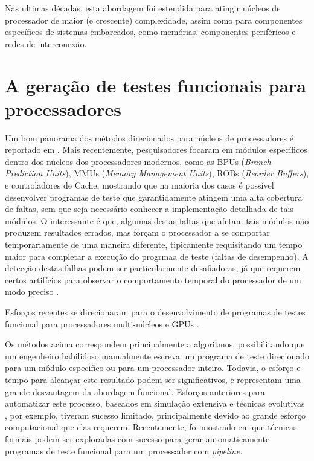 			Nas ultimas décadas, esta abordagem foi estendida para atingir núcleos de processador de maior (e crescente) complexidade, assim como para componentes específicos de sistemas embarcados, como memórias, componentes periféricos e redes de interconexão.
		\section{A geração de testes funcionais para processadores}
			Um bom panorama dos métodos direcionados para núcleos de processadores é reportado em \citet{psarakis2010microprocessor}. Mais recentemente, pesquisadores focaram em módulos específicos dentro dos núcleos dos processadores modernos, como as BPUs (\textit{Branch Prediction Units}), MMUs (\textit{Memory Management Units}), ROBs (\textit{Reorder Buffers}), e controladores de Cache, mostrando que na maioria dos casos é possível desenvolver programas de teste que garantidamente atingem uma alta cobertura de faltas, sem que seja necessário conhecer a implementação detalhada de tais módulos. O interessante é que, algumas destas faltas que afetam tais módulos não produzem resultados errados, mas forçam o processador a se comportar temporariamente de uma maneira diferente, tipicamente requisitando um tempo maior para completar a execução do progrmaa de teste (faltas de desempenho). A detecção destas falhas podem ser particularmente desafiadoras, já que requerem certos artifícios para observar o comportamento temporal do processador de um modo preciso \citep{hatzimihail2007methodology}.
			
			Esforços recentes se direcionaram para o desenvolvimento de programas de testes funcional para processadores multi-núcleos \citep{kaliorakis2014accelerated} e GPUs \citep{di2013software}.
			
			Os métodos acima correspondem principalmente a algoritmos, possibilitando que um engenheiro habilidoso manualmente escreva um programa de teste direcionado para um módulo especifico ou para um processador inteiro. Todavia, o esforço e tempo para alcançar este resultado podem ser significativos, e representam uma grande desvantagem da abordagem funcional. Esforços anteriores para automatizar este processo, baseados em simulação extensiva e técnicas evolutivas \citep{corno2004automatic}, por exemplo, tiveram sucesso limitado, principalmente devido ao grande esforço computacional que elas requerem. Recentemente, foi mostrado em \citet{riefert2014effective} que técnicas formais podem ser exploradas com sucesso para gerar automaticamente programas de teste funcional para um processador com \textit{pipeline}.
			
